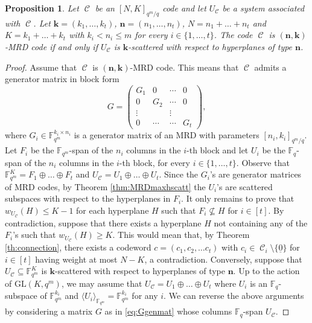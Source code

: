 \documentclass[11pt]{amsart}
\DeclareMathOperator{\C}{\mathcal{C}}
\newtheorem{proposition}[theorem]{Proposition}
\newcommand{\fqm}{\mathbb{F}_{q^m}}
\newcommand{\fq}{{\mathbb F}_{q}}
\begin{document}
\begin{proposition}\label{prop:geo(n.k)-MRD}
    Let $\C$ be an $[N,K]_{q^m/q}$ code and let $U_{\C}$ be a system associated with $\C$.
    Let ${\mathbf k}=(k_1,\ldots,k_t)$, ${\mathbf n}=(n_1,\ldots,n_t)$, $N=n_1+\ldots+n_t$ and $K=k_1+\ldots+k_t$ with $k_i<n_i\leq m$ for every $i\in \{1,\ldots,t\}$.
    The code $\C$ is $(\mathbf{n},\mathbf{k})$-MRD code if and only if $U_{\C}$ is $\mathbf{k}$-scattered with respect to hyperplanes of type $\mathbf{n}$. 
\end{proposition}
\begin{proof}
    Assume that $\C$ is $(\mathbf{n},\mathbf{k})$-MRD code.
    This means that $\C$ admits a generator matrix in block form
    \begin{equation}\label{eq:Ggenmat}
    G=\begin{pmatrix}
        G_1 & 0 & \cdots & 0\\
        0 & G_2 & \cdots & 0\\
        \vdots & & \vdots\\
        0 & \cdots & \cdots & G_t
    \end{pmatrix},
    \end{equation}
    where $G_i \in \fqm^{k_i\times n_i}$ is a generator matrix of an MRD with parameters $[n_i,k_i]_{q^m/q}$.
    Let $F_i$ be the $\fqm$-span of the $n_i$ columns in the $i$-th block and let $U_i$ be the $\fq$-span of the $n_i$ columns in the $i$-th block, for every $i \in \{1,\ldots,t\}$.
    Observe that $\fqm^K=F_1\oplus\ldots\oplus F_t$ and $U_{\C}=U_1\oplus\ldots\oplus U_t$.
    Since the $G_i$'s are generator matrices of MRD codes, by Theorem \ref{thm:MRDmaxhscatt} the $U_i$'s are scattered subspaces with respect to the hyperplanes in $F_i$.
    It only remains to prove that  $w_{U_{\C}}(H)\leq K-1$ for each hyperplane $H$ such that $F_i\not\subseteq H$ for $i \in [t]$.
    By contradiction, suppose that there exists a hyperplane $H$ not containing any of the $F_i$'s such that 
    $w_{U_{\C}}(H)\geq K$.
    This would mean that, by Theorem \ref{th:connection}, there exists a codeword  $c=( c_1,c_2,\dots c_t)$ with $c_i \in \C_i\setminus \{\underline 0\}$ for $i \in [t]$  having weight at most $N-K$, a contradiction.
Conversely, suppose that $U_{\C} \subseteq \fqm^K$ is $\mathbf{k}$-scattered with respect to hyperplanes of type $\mathbf{n}$. Up to the action of $\mathrm{GL}(K,q^m)$, we may assume that $U_{\C}=U_1\oplus \ldots\oplus U_t$ where $U_i$ is an $\fq$-subspace of $\fqm^{k_i}$ and $\langle U_i \rangle_{\fqm}=\fqm^{k_i}$ for any $i$. We can reverse the above arguments by considering a matrix $G$ as in \ref{eq:Ggenmat} whose columns $\fq$-span $U_{\C}$.
\end{proof}
\end{document}
